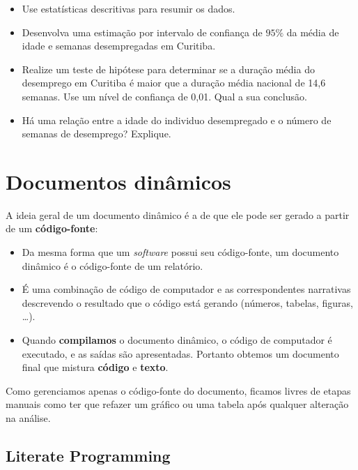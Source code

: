 \documentclass[
  10pt,
  a4paper]{book}
\providecommand{\tightlist}{%
  \setlength{\itemsep}{0pt}\setlength{\parskip}{0pt}}
\begin{document}
\begin{itemize}
\tightlist
\item
  Use estatísticas descritivas para resumir os dados.
\item
  Desenvolva uma estimação por intervalo de confiança de \(95\%\) da média de idade e semanas desempregadas em Curitiba.
\item
  Realize um teste de hipótese para determinar se a duração média do desemprego em Curitiba é maior que a duração média nacional de 14,6 semanas. Use um nível de confiança de 0,01. Qual a sua conclusão.
\item
  Há uma relação entre a idade do individuo desempregado e o número de semanas de desemprego? Explique.
\end{itemize}

\hypertarget{appendix-apuxeandice}{%
\appendix}


\hypertarget{documentos-dinuxe2micos}{%
\chapter{Documentos dinâmicos}\label{documentos-dinuxe2micos}}

A ideia geral de um documento dinâmico é a de que ele pode ser gerado a
partir de um \textbf{código-fonte}:

\begin{itemize}
\tightlist
\item
  Da mesma forma que um \emph{software} possui seu código-fonte, um documento
  dinâmico é o código-fonte de um relatório.
\item
  É uma combinação de código de computador e as correspondentes
  narrativas descrevendo o resultado que o código está gerando (números,
  tabelas, figuras, \ldots).
\item
  Quando \textbf{compilamos} o documento dinâmico, o código de computador é
  executado, e as saídas são apresentadas. Portanto obtemos um documento
  final que mistura \textbf{código} e \textbf{texto}.
\end{itemize}

Como gerenciamos apenas o código-fonte do documento, ficamos livres de
etapas manuais como ter que refazer um gráfico ou uma tabela após
qualquer alteração na análise.

\hypertarget{literate-programming}{%
\section{Literate Programming}\label{literate-programming}}
\end{document}
